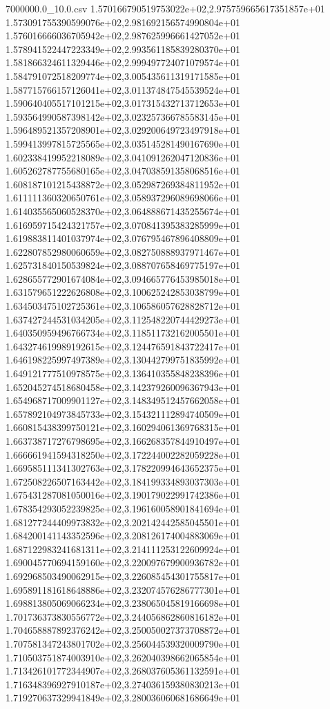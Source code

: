 \begin{filecontents*}{7000000.0_10.0.csv}
1.570166790519753022e+02,2.975759665617351857e+01
1.573091755390599076e+02,2.981692156574990804e+01
1.576016666036705942e+02,2.987625996661427052e+01
1.578941522447223349e+02,2.993561185839280370e+01
1.581866324611329446e+02,2.999497724071079574e+01
1.584791072518209774e+02,3.005435611319171585e+01
1.587715766157126041e+02,3.011374847545539524e+01
1.590640405517101215e+02,3.017315432713712653e+01
1.593564990587398142e+02,3.023257366785583145e+01
1.596489521357208901e+02,3.029200649723497918e+01
1.599413997815725565e+02,3.035145281490167690e+01
1.602338419952218089e+02,3.041091262047120836e+01
1.605262787755680165e+02,3.047038591358068516e+01
1.608187101215438872e+02,3.052987269384811952e+01
1.611111360320650761e+02,3.058937296089698066e+01
1.614035565060528370e+02,3.064888671435255674e+01
1.616959715424321757e+02,3.070841395383285999e+01
1.619883811401037974e+02,3.076795467896408809e+01
1.622807852980060659e+02,3.082750888937971467e+01
1.625731840150539824e+02,3.088707658469775197e+01
1.628655772901674084e+02,3.094665776453985018e+01
1.631579651222626808e+02,3.100625242853038799e+01
1.634503475102725361e+02,3.106586057628828712e+01
1.637427244531034205e+02,3.112548220744429273e+01
1.640350959496766734e+02,3.118511732162005501e+01
1.643274619989192615e+02,3.124476591843722417e+01
1.646198225997497389e+02,3.130442799751835992e+01
1.649121777510978575e+02,3.136410355848238396e+01
1.652045274518680458e+02,3.142379260096367943e+01
1.654968717009901127e+02,3.148349512457662058e+01
1.657892104973845733e+02,3.154321112894740509e+01
1.660815438399750121e+02,3.160294061369768315e+01
1.663738717276798695e+02,3.166268357844910497e+01
1.666661941594318250e+02,3.172244002282059228e+01
1.669585111341302763e+02,3.178220994643652375e+01
1.672508226507163442e+02,3.184199334893037303e+01
1.675431287081050016e+02,3.190179022991742386e+01
1.678354293052239825e+02,3.196160058901841694e+01
1.681277244409973832e+02,3.202142442585045501e+01
1.684200141143352596e+02,3.208126174004883069e+01
1.687122983241681311e+02,3.214111253122609924e+01
1.690045770694159160e+02,3.220097679900936782e+01
1.692968503490062915e+02,3.226085454301755817e+01
1.695891181618648886e+02,3.232074576286777301e+01
1.698813805069066234e+02,3.238065045819166698e+01
1.701736373830556772e+02,3.244056862860816182e+01
1.704658887892376242e+02,3.250050027373708872e+01
1.707581347243801702e+02,3.256044539320009790e+01
1.710503751874003910e+02,3.262040398662065854e+01
1.713426101772344907e+02,3.268037605361132591e+01
1.716348396927910187e+02,3.274036159380830213e+01
1.719270637329941849e+02,3.280036060681686649e+01

\end{filecontents*}
